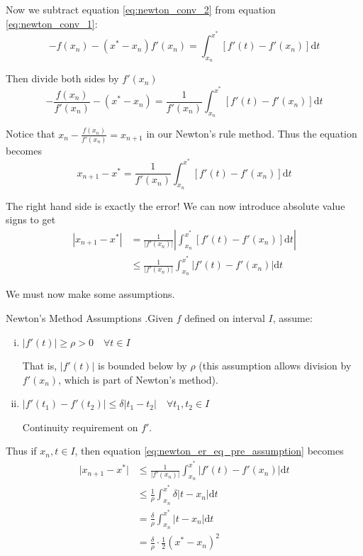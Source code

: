 \documentclass[12pt,letterpaper]{article}
\newcommand{\dd}{\mathrm{d}}
\begin{document}
Now we subtract equation \ref{eq:newton_conv_2} from equation \ref{eq:newton_conv_1}:
\begin{equation}
	-f(x_n) - (x^* - x_n) f'(x_n) = \int_{x_n}^{x^*} \left[ f'(t) - f'(x_n) \right] \dd t
\end{equation}

Then divide both sides by $f'(x_n)$
\begin{equation}
	-\frac{f(x_n)}{f'(x_n)} - (x^* - x_n) = \frac{1}{f'(x_n)} \int_{x_n}^{x^*} \left[ f'(t) - f'(x_n) \right] \dd t
\end{equation}

Notice that $x_n - \frac{f(x_n)}{f'(x_n)} = x_{n+1}$ in our Newton's rule method. Thus the equation becomes
\begin{equation}
	x_{n+1} - x^* = \frac{1}{f'(x_n)} \int_{x_n}^{x^*} \left[ f'(t) - f'(x_n) \right] \dd t
\end{equation}

The right hand side is exactly the error! We can now introduce absolute value signs to get
\begin{align}
	\left\lvert x_{n+1} - x^* \right\rvert &= \frac{1}{\lvert f'(x_n) \rvert}
	\left\lvert \int_{x_n}^{x^*} \left[ f'(t) - f'(x_n) \right] \dd t \right\rvert \\
	&\leq \frac{1}{\lvert f'(x_n) \rvert} \int_{x_n}^{x^*} \left\lvert f'(t) - f'(x_n) \right\lvert \dd t
	\label{eq:newton_er_eq_pre_assumption}
\end{align}

We must now make some assumptions.

\begin{constr}{Newton's Method Assumptions}
.Given $f$ defined on interval $I$, assume:
\begin{enumerate}[(i)]
	\item $\lvert f'(t) \rvert \geq \rho > 0 \quad \forall t \in I$
	
	\medskip
	That is, $\lvert f'(t) \rvert$ is bounded below by $\rho$ (this assumption allows division by $f'(x_n)$, which is part of Newton's method).
	
	\item $\lvert f'(t_1) - f'(t_2) \rvert \leq \delta \lvert t_1 - t_2 \rvert \quad \forall t_1, t_2 \in I$
	
	\medskip
	Continuity requirement on $f'$.
\end{enumerate}
\end{constr}

Thus if $x_n, t \in I$, then equation \ref{eq:newton_er_eq_pre_assumption} becomes
\begin{align}
	\lvert x_{n+1} - x^* \rvert &\leq \frac{1}{\lvert f'(x_n) \rvert} \int_{x_n}^{x^*} \left\lvert f'(t) - f'(x_n) \right\lvert \dd t \\
	&\leq \frac{1}{\rho} \int_{x_n}^{x^*} \delta \left\lvert t - x_n \right\lvert \dd t \\
	&= \frac{\delta}{\rho} \int_{x_n}^{x^*} \lvert t - x_n \rvert \dd t \\
	&= \frac{\delta}{\rho} \cdot \frac{1}{2} (x^* - x_n)^2 \label{eq:newton_error_integral}
\end{align}
\end{document}

